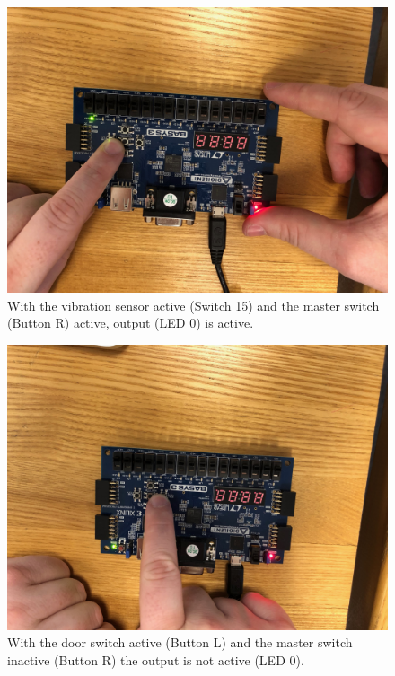 \documentclass[11pt]{article}
\begin{document}
\begin{figure}[H]
	\includegraphics[width=\textwidth]{report_images/Lab1BoardPictures/Lab1Part2/IMG_0413.jpg}
	\caption{\label{fig:figure-name}With the vibration sensor active (Switch 15) and the master switch (Button R) active, output (LED 0) is active.}
\end{figure}

\begin{figure}[H]
	\includegraphics[width=\textwidth]{report_images/Lab1BoardPictures/Lab1Part2/IMG_0414.jpg}
	\caption{\label{fig:figure-name}With the door switch active (Button L) and the master switch inactive (Button R) the output is not active (LED 0).}
\end{figure}
\end{document}
